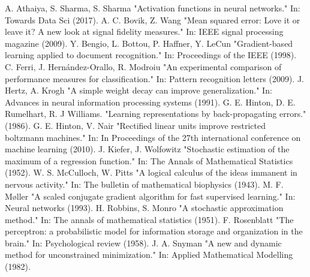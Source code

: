 \documentclass[10pt, conference]{IEEEtran}
\begin{document}
\begin{thebibliography}{00}
     A. Athaiya, S. Sharma, S. Sharma "Activation functions in neural networks." In: Towards Data Sci (2017).
     A. C. Bovik, Z. Wang "Mean squared error: Love it or leave it? A new look at signal fidelity measures." In: IEEE signal processing magazine (2009).
     Y. Bengio, L. Bottou, P. Haffner, Y. LeCun "Gradient-based learning applied to document recognition." In: Proceedings of the IEEE (1998).
     C. Ferri, J. Hernández-Orallo, R. Modroiu "An experimental comparison of performance measures for classification." In: Pattern recognition letters (2009).
     J. Hertz, A. Krogh "A simple weight decay can improve generalization." In: Advances in neural information processing systems (1991).
     G. E. Hinton, D. E. Rumelhart, R. J Williams. "Learning representations by back-propagating errors." (1986).
     G. E. Hinton, V. Nair "Rectified linear units improve restricted boltzmann machines." In: In Proceedings of the 27th international conference on machine learning (2010).
     J. Kiefer, J. Wolfowitz "Stochastic estimation of the maximum of a regression function." In: The Annals of Mathematical Statistics (1952).
     W. S. McCulloch, W. Pitts "A logical calculus of the ideas immanent in nervous activity." In: The bulletin of mathematical biophysics (1943).
     M. F. Møller "A scaled conjugate gradient algorithm for fast supervised learning." In: Neural networks (1993).
     H. Robbins, S. Monro "A stochastic approximation method." In: The annals of mathematical statistics (1951).
     F. Rosenblatt "The perceptron: a probabilistic model for information storage and organization in the brain." In: Psychological review (1958).
     J. A. Snyman "A new and dynamic method for unconstrained minimization." In: Applied Mathematical Modelling (1982).
\end{thebibliography}

\printglossary[type=\acronymtype]
\end{document}
